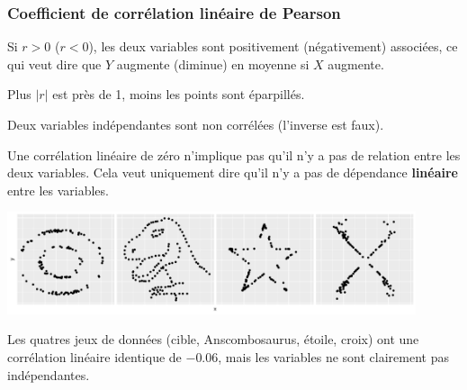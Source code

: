 \documentclass[xcolor={dvipsnames}]{beamer}
\begin{document}
\begin{frame}[fragile]
\frametitle{Coefficient de corrélation linéaire de Pearson}
\bi
\item Si $r>0$ ($r<0$), les deux variables sont positivement (négativement) associées, ce qui veut dire que $Y$ augmente (diminue) en moyenne si $X$ augmente.
\item Plus $|r|$ est près de 1, moins les points sont éparpillés.
\item Deux variables indépendantes sont non corrélées (l'inverse est faux).
\item Une corrélation linéaire de zéro n'implique pas qu'il n'y a pas de relation entre les deux variables. Cela veut uniquement dire qu'il n'y a pas de dépendance \textbf{linéaire} entre les variables.

\ei

\begin{center}
 \includegraphics[width = 0.9\textwidth]{img/c2/03-linreg-datasaurus}
\end{center}
{\footnotesize
Les quatres jeux de données (cible,  Anscombosaurus, étoile, croix) ont une corrélation linéaire identique de $-0.06$, mais les variables ne sont clairement pas indépendantes.


}

\end{frame}


\end{document}
